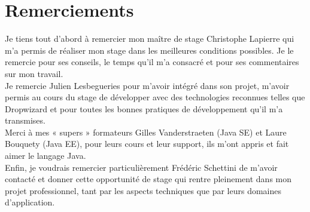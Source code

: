 \chapter*{Remerciements}

Je tiens tout d’abord à remercier mon maître de stage Christophe Lapierre qui m’a permis de réaliser mon stage dans les meilleures conditions possibles. Je le remercie pour ses conseils, le temps qu’il m’a consacré et pour ses commentaires sur mon travail. \\

Je remercie Julien Lesbegueries pour m'avoir intégré dans son projet, m'avoir permis au cours du stage de développer avec des technologies reconnues telles que Dropwizard et pour toutes les bonnes pratiques de développement qu'il m'a transmises.\\

Merci à mes « supers » formateurs Gilles Vanderstraeten (Java SE) et Laure Bouquety (Java EE), pour leurs cours et leur support, ils m'ont appris et fait aimer le langage Java. \\

Enfin, je voudrais remercier particulièrement Frédéric Schettini de m’avoir contacté et donner cette opportunité de stage qui rentre pleinement dans mon projet professionnel, tant par les aspects techniques que par leurs domaines d'application. \\
